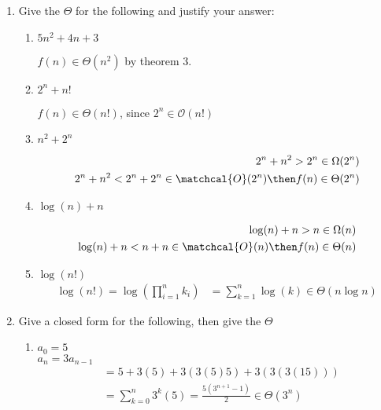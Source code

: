 \documentclass[basic, header]{nosvagor-notes}
\begin{document}
\begin{enumerate}[itemsep=4em]

  \item Give the \(\Theta\) for the following and justify your answer:
    \begin{enumerate}[itemsep=3em]

      \item $5n^2 + 4n + 3$

        \vspace{1em}
        \(f(n) \in \Theta(n^2) \) by theorem 3.

      \item $2^n + n!$

        \vspace{1em}
        \(f(n) \in \Theta(n!) \), since \(2^n \in \mathcal{O}({n!})\)

      \item $n^2 + 2^n$

        \begin{align*}
          2^n + n^2 > 2^n \in \Omega(2^n) \\
          2^n + n^2 < 2^n +2^n \in \matchcal{O}(2^n) \then f(n) \in \Theta(2^n)
        \end{align*}

      \item $\log(n) + n$

        \begin{align*}
          \log(n) + n > n \in \Omega(n) \\
          \log(n) + n < n + n \in \matchcal{O}(n) \then f(n) \in \Theta(n)
        \end{align*}

      \item $\log(n!)$
        \begin{align*}
          \log(n!)
          = \log\left( \prod_{i=1}^{n} k_i \right)
          &= \sum_{k=1}^{n} \log(k) \in \Theta(n \log n)
        \end{align*}

    \end{enumerate}

  \newpage %

  \item Give a closed form for the following, then give the $\Theta$
     \begin{enumerate}[itemsep=2em]

      \item $a_0 = 5$\\
        $a_n = 3a_{n-1}$
        \begin{align*}
          &= 5 + 3(5) + 3(3(5)5) + 3(3(3(15))) \\
          &= \sum_{k=0}^{n} 3^k(5) = \frac{5(3^{n+1} -1) }{2} \in \Theta(3^n)
        \end{align*}


\end{enumerate}
\end{enumerate}
\end{document}
